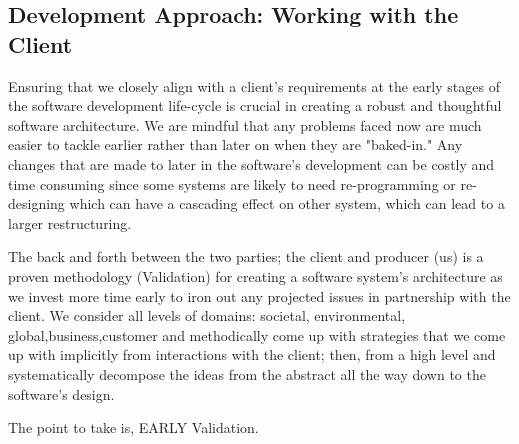 \documentclass{article}
\begin{document}
\subsection{Development Approach: Working with the Client}
Ensuring that we closely align with a client's requirements at the early stages of the software development life-cycle is crucial in creating a robust and thoughtful software architecture. We are mindful that any problems faced now are much easier to tackle earlier rather than later on when they are "baked-in." Any changes that are made to later in the software's development can be costly and time consuming since some systems are likely to need re-programming or re-designing which can have a cascading effect on other system, which can lead to a larger restructuring. 

The back and forth between the two parties; the client and producer (us) is a proven methodology (Validation) for creating a software system's architecture as we invest more time early to iron out any projected issues in partnership with the client. We consider all levels of domains: societal, environmental, global,business,customer and methodically come up with strategies that we come up with implicitly from interactions with the client; then, from a high level and systematically decompose the ideas from the abstract all the way down to the software's design.

The point to take is, EARLY Validation.

\end{document}
